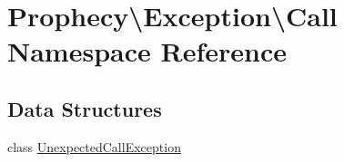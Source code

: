 \hypertarget{namespace_prophecy_1_1_exception_1_1_call}{}\section{Prophecy\textbackslash{}Exception\textbackslash{}Call Namespace Reference}
\label{namespace_prophecy_1_1_exception_1_1_call}
\subsection*{Data Structures}
\begin{DoxyCompactItemize}
\item 
class \mbox{\hyperlink{class_prophecy_1_1_exception_1_1_call_1_1_unexpected_call_exception}{Unexpected\+Call\+Exception}}
\end{DoxyCompactItemize}
